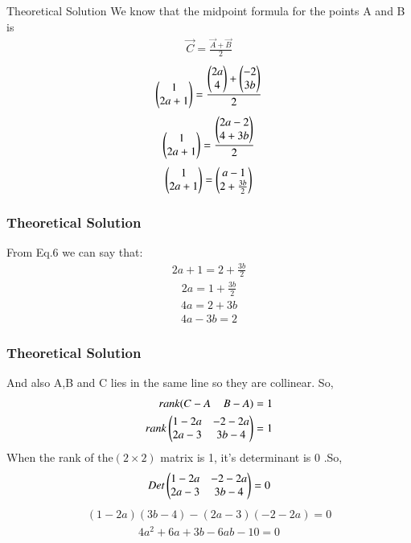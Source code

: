 \documentclass{beamer}
\begin{document}
\begin{frame}{Theoretical Solution}
We know that the midpoint formula for the points A and B is
\begin{align}
    \vec{C}=\frac{\vec{A}+\vec{B}}{2}
    \end{align}
\begin{align}
    \myvec{1\\2a+1}=\frac{\myvec{2a\\4}+\myvec{-2\\3b}}{2}
\end{align}
\begin{align}
    \myvec{1\\2a+1}=\frac{\myvec{2a-2\\4+3b}}{2}
\end{align}
\begin{align}
    \myvec{1\\2a+1}=\myvec{a-1\\2+\frac{3b}{2}}
\end{align}

\end{frame}
\begin{frame}
\frametitle{Theoretical Solution}
From Eq.6 we can say that:
\begin{align}
    2a+1=2+\frac{3b}{2}
\end{align}
\begin{align}
    2a=1+\frac{3b}{2}
\end{align}
\begin{align}
    4a=2+3b
\end{align}
\begin{align}
    4a-3b=2
\end{align}

\end{frame}
\begin{frame}
\frametitle{Theoretical Solution}

And also A,B and C lies in the same line so they are collinear. So,
\begin{align}
   rank(C-A\;\;\;\;B-A )=1\\
   rank\myvec{1-2a&-2-2a\\
   2a-3&3b-4}=1
\end{align}
When  the rank of the$(2\times2)$ matrix is 1, it's determinant is 0 .So,
\begin{align}
   Det\myvec{1-2a&-2-2a\\2a-3&3b-4}=0
\end{align}
\begin{align}
    (1-2a)(3b-4)-(2a-3)(-2-2a)=0
\end{align}
\begin{align}
    4a^2+6a+3b-6ab-10=0
\end{align}
\end{frame}
\end{document}
